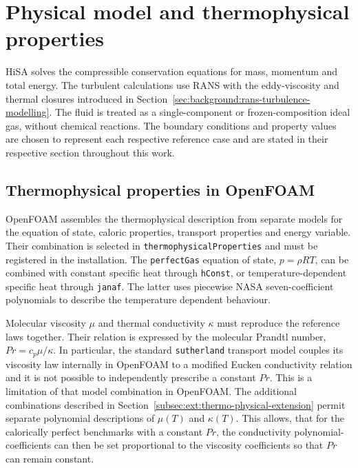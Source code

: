 \section{Physical model and thermophysical properties}
\label{sec:numerical-framework:governing-equations}

HiSA solves the compressible conservation equations for mass, momentum and
total energy. The turbulent calculations use RANS with the eddy-viscosity and
thermal closures introduced in Section~\ref{sec:background:rans-turbulence-modelling}. The fluid is treated as a single-component or frozen-composition ideal gas, without chemical reactions. The boundary conditions and property values are chosen to represent each respective reference case and are stated in their respective section throughout this work.

\subsection{Thermophysical properties in OpenFOAM}
\label{subsec:thermophysical-properties-OF}

OpenFOAM assembles the thermophysical description from separate models for the
equation of state, caloric properties, transport properties and energy variable.
Their combination is selected in \texttt{thermophysicalProperties} and must be
registered in the installation. The \texttt{perfectGas} equation of state, \(p=\rho RT\), can be combined with constant specific heat through \texttt{hConst}, or temperature-dependent
specific heat through \texttt{janaf}. The latter uses piecewise NASA
seven-coefficient polynomials to describe the temperature dependent behaviour.
\par\medskip

Molecular viscosity \(\mu\) and thermal conductivity \(\kappa\) must reproduce
the reference laws together. Their relation is expressed by the molecular
Prandtl number, \(Pr=c_p\mu/\kappa\). In particular, the standard
\texttt{sutherland} transport model couples its viscosity law internally in OpenFOAM to a modified
Eucken conductivity relation and it is not possible to independently prescribe a constant
\(Pr\). This is a limitation of that model combination in OpenFOAM. The additional combinations described in Section~\ref{subsec:ext:thermo-physical-extension} permit separate polynomial
descriptions of \(\mu(T)\) and \(\kappa(T)\). This allows, that for the calorically perfect
benchmarks with a constant \(Pr\), the conductivity polynomial-coefficients can then be set proportional to the viscosity coefficients so that \(Pr\) can remain constant.

